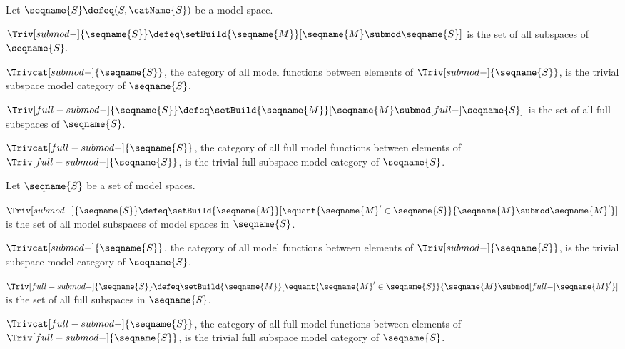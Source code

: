 \documentclass{article}
\begin{document}
\begin{definition}
\label{def:modtrivcat}
Let $\seqname{S} \defeq (S, \catName{S})$ be a model space.

$
  \Triv[submod-]{\seqname{S}}
  \defeq
  \setBuild
    {\seqname{M}}%
    [\seqname{M} \submod \seqname{S}]
$
is the set of all subspaces of $\seqname{S}$.

$\Trivcat[submod-]{\seqname{S}}$, the category of all model functions
between elements of $\Triv[submod-]{\seqname{S}}$, is the trivial
subspace model category of $\seqname{S}$.

$
  \Triv[full-submod-]{\seqname{S}}
  \defeq
  \setBuild
    {\seqname{M}}%
    [\seqname{M} \submod[full-] \seqname{S}]
$
is the set of all full subspaces of $\seqname{S}$.

$\Trivcat[full-submod-]{\seqname{S}}$, the category of all full model
functions between elements of $\Triv[full-submod-]{\seqname{S}}$, is the
trivial full subspace model category of $\seqname{S}$.

Let $\seqname{S}$ be a set of model spaces.

$
  \Triv[submod-]{\seqname{S}}
  \defeq
  \setBuild
    {\seqname{M}}%
    [
      \equant
        {\seqname{M}' \in \seqname{S}}
        {\seqname{M} \submod \seqname{M}'}
    ]
$
is the set of all model subspaces of model spaces in $\seqname{S}$.

$\Trivcat[submod-]{\seqname{S}}$, the category of all model functions
between elements of $\Triv[submod-]{\seqname{S}}$, is the trivial
subspace model category of $\seqname{S}$.

$
  \Triv[full-submod-]{\seqname{S}}
  \defeq
  \setBuild
    {\seqname{M}}%
    [
      \equant
        {\seqname{M}' \in \seqname{S}}
        {\seqname{M} \submod[full-] \seqname{M}'}
    ]
$
is the set of all full subspaces in $\seqname{S}$.

$\Trivcat[full-submod-]{\seqname{S}}$, the category of all full model
functions between elements of $\Triv[full-submod-]{\seqname{S}}$, is the
trivial full subspace model category of $\seqname{S}$.
\end{definition}
\end{document}
